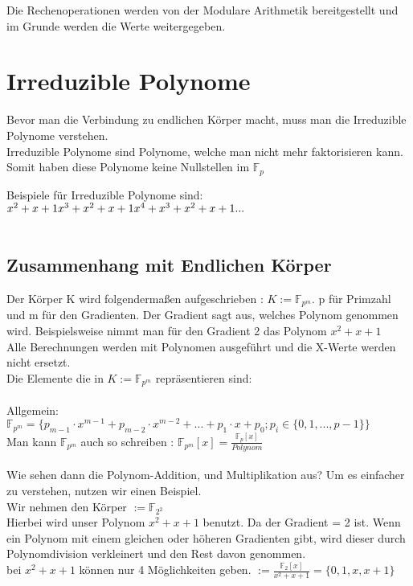 Die Rechenoperationen werden von der Modulare Arithmetik bereitgestellt und im Grunde werden die Werte weitergegeben.

\newpage
\section{Irreduzible Polynome}

Bevor man die Verbindung zu endlichen Körper macht, muss man die Irreduzible Polynome verstehen.\\
Irreduzible Polynome sind Polynome, welche man nicht mehr faktorisieren kann. Somit haben diese Polynome keine Nullstellen im $\mathbb{F}_{p} $

Beispiele für Irreduzible Polynome sind:\\
$
x^2+ x + 1\\
x^3 + x^2 + x + 1 \\
x^4 + x^3  + x^2 + x + 1\\
...
$
\\
\\
\subsection{Zusammenhang mit Endlichen Körper}

Der Körper K wird folgendermaßen aufgeschrieben : $ K := \mathbb{F}_{p^m}$. p für Primzahl und m für den Gradienten. Der Gradient sagt aus, welches Polynom genommen wird. 
Beispielsweise nimmt man für den Gradient 2 das Polynom $x^2 + x + 1$\\
Alle Berechnungen werden mit Polynomen ausgeführt und die X-Werte werden nicht ersetzt.
\\
Die Elemente die in $ K := \mathbb{F}_{p^m}$ repräsentieren sind:\\
\\
Allgemein: $  \mathbb{F}_{p^m} = \{p_{m-1} \cdot x^{m-1} + p_{m-2} \cdot x^{m-2} + ... + p_1 \cdot x + p_0 ; p_i \in \{0,1,..., p-1\} \}$\\
Man kann $\mathbb{F}_{p^m}$ auch so schreiben : $\mathbb{F}_{p^m}[x] = \frac{\mathbb{F}_{p}[x]}{Polynom} $\\
\\
Wie sehen dann die Polynom-Addition, und Multiplikation aus? Um es einfacher zu verstehen, nutzen wir einen Beispiel.
\\
Wir nehmen den Körper $ := \mathbb{F}_{2^2}$
\\
Hierbei wird unser Polynom $ x^2+ x + 1 $ benutzt. Da der Gradient = 2 ist. Wenn ein Polynom mit einem gleichen oder höheren Gradienten gibt, wird dieser durch Polynomdivision verkleinert und den Rest davon genommen.\\
bei $ x^2+ x + 1 $ können nur 4 Möglichkeiten geben. $ := \frac{\mathbb{F}_{2}[x]}{x^2+ x + 1} = \{0, 1, x, x+1\}$\\

